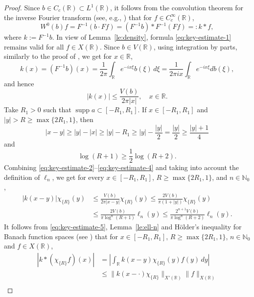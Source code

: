 \documentclass[reqno]{amsproc}
\newcommand{\N}{\mathbb{N}}
\newcommand{\R}{\mathbb{R}}
\theoremstyle{definition}
\theoremstyle{remark}
\numberwithin{equation}{section}
\begin{document}
\begin{proof}
Since $b\in C_c(\R)\subset L^1(\R)$, it follows from the convolution theorem
for the inverse Fourier transform (see, e.g., \cite[Theorem~11.66]{A20})
that for $f\in C_c^\infty(\R)$,
\begin{equation}\label{eq:key-estimate-1}
W^0(b)f=F^{-1}(b\cdot Ff)=(F^{-1}b)*F^{-1}(Ff)=:k*f,
\end{equation}
where $k:=F^{-1}b$. In view of Lemma~\ref{le:density}, formula
\eqref{eq:key-estimate-1} remains valid for all $f\in X(\R)$.
Since $b\in V(\R)$, using integration by parts, similarly to the proof
of \cite[Chap.~I, Theorem~4.5]{K76}, we get for $x\in\R$,
\[
k(x)
=
(F^{-1}b)(x)
=
\frac{1}{2\pi}\int_\R e^{-ix\xi}b(\xi)\,d\xi
=
\frac{1}{2\pi ix}\int_\R e^{-ix\xi}db(\xi),
\]
and hence
\begin{equation}\label{eq:key-estimate-2}
|k(x)|\le \frac{V(b)}{2\pi|x|},
\quad
x\in\R.
\end{equation}
Take $R_1>0$ such that $\operatorname{supp}a\subset[-R_1,R_1]$. If
$x\in[-R_1,R_1]$ and $|y|>R\ge\max\{2R_1,1\}$, then
\begin{equation}\label{eq:key-estimate-3}
|x-y|\ge|y|-|x|\ge|y|-R_1\ge|y|-\frac{|y|}{2}=\frac{|y|}{2}\ge\frac{|y|+1}{4}
\end{equation}
and
\begin{equation}\label{eq:key-estimate-4}
\log(R+1)\ge\frac{1}{2}\log(R+2).
\end{equation}
Combining \eqref{eq:key-estimate-2}--\eqref{eq:key-estimate-4} and
taking into account the definition of $\ell_n$, we get for every
$x\in[-R_1,R_1]$, $R\ge\max\{2R_1,1\}$, and $n\in\N_0$,
\begin{align}
|k(x-y)|\chi_{\{R\}}(y)
&\le 
\frac{V(b)}{2\pi|x-y|}\chi_{\{R\}}(y)
\le 
\frac{2V(b)}{\pi(1+|y|)}\chi_{\{R\}}(y)
\nonumber\\
&\le 
\frac{2V(b)}{\pi\log^n(R+1)}\ell_n(y)
\le 
\frac{2^{n+1}V(b)}{\pi\log^n(R+2)}\ell_n(y).
\label{eq:key-estimate-5}
\end{align}
It follows from \eqref{eq:key-estimate-5}, Lemma~\ref{le:ell-n} and
H\"older's inequality for Banach function spaces (see 
\cite[Chap.~1, Theorem~2.4]{BS88}) that for $x\in[-R_1,R_1]$, 
$R\ge\max\{2R_1,1\}$, $n\in\N_0$ and $f\in X(\R)$,
\begin{align}
|k*(\chi_{\{R\}}f)(x)|
&=
\left|\int_\R k(x-y)\chi_{\{R\}}(y)f(y)\,dy\right|
\nonumber\\
&\le 
\|k(x-\cdot)\chi_{\{R\}}\|_{X'(\R)}\|f\|_{X(\R)}
\nonumber\\

\end{align}
\end{proof}
\end{document}
